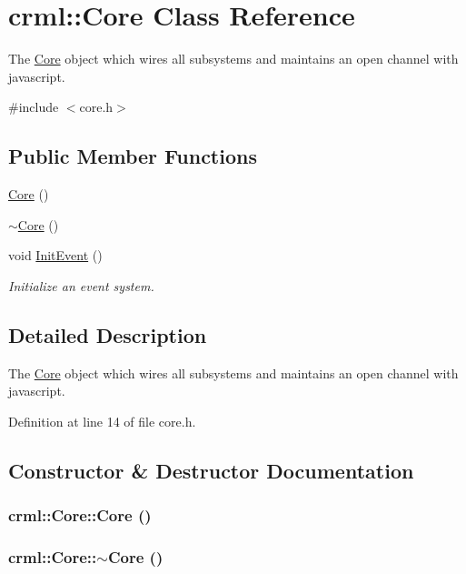 \hypertarget{classcrml_1_1_core}{
\section{crml::Core Class Reference}
\label{classcrml_1_1_core}
}


The \hyperlink{classcrml_1_1_core}{Core} object which wires all subsystems and maintains an open channel with javascript.  




{\ttfamily \#include $<$core.h$>$}

\subsection*{Public Member Functions}
\begin{DoxyCompactItemize}
\item 
\hyperlink{classcrml_1_1_core_a114b61db0d73f1661af6541697480ec7}{Core} ()
\item 
\hyperlink{classcrml_1_1_core_ac7d8f9cf90da2e7443a4d029aff56e1b}{$\sim$Core} ()
\item 
void \hyperlink{classcrml_1_1_core_abd19dcc900bcca0b9ad0cf3a831329f9}{InitEvent} ()
\begin{DoxyCompactList}\small\item\em Initialize an event system. \item\end{DoxyCompactList}\end{DoxyCompactItemize}


\subsection{Detailed Description}
The \hyperlink{classcrml_1_1_core}{Core} object which wires all subsystems and maintains an open channel with javascript. 

Definition at line 14 of file core.h.



\subsection{Constructor \& Destructor Documentation}
\hypertarget{classcrml_1_1_core_a114b61db0d73f1661af6541697480ec7}{
\subsubsection[{Core}]{\setlength{\rightskip}{0pt plus 5cm}crml::Core::Core ()}}
\label{classcrml_1_1_core_a114b61db0d73f1661af6541697480ec7}
\hypertarget{classcrml_1_1_core_ac7d8f9cf90da2e7443a4d029aff56e1b}{
\subsubsection[{$\sim$Core}]{\setlength{\rightskip}{0pt plus 5cm}crml::Core::$\sim$Core ()}}
\label{classcrml_1_1_core_ac7d8f9cf90da2e7443a4d029aff56e1b}


